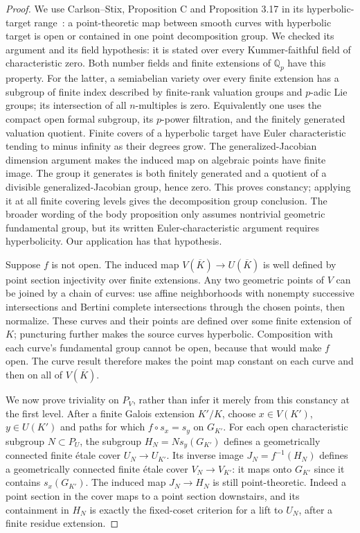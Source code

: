 \documentclass[11pt,oneside]{article}
\begin{document}
\begin{proof}
We use Carlson--Stix, Proposition C and Proposition 3.17 in its
hyperbolic-target range~\cite{F-CarlsonStix}: a point-theoretic
map between smooth curves with hyperbolic target is open or
contained in one point decomposition group. We checked its
argument and its field hypothesis: it is stated over every
Kummer-faithful field of characteristic zero. Both number fields
and finite extensions of $\mathbb Q_p$ have this property.
For the latter, a semiabelian variety over every finite extension
has a subgroup of finite index described by finite-rank valuation
groups and $p$-adic Lie groups; its intersection of all $n$-multiples
is zero. Equivalently one uses the compact open formal subgroup,
its $p$-power filtration, and the finitely generated valuation
quotient. Finite covers of a hyperbolic target have Euler
characteristic tending to minus infinity as their degrees grow.
The generalized-Jacobian dimension argument makes the induced
map on algebraic points have finite image. The group it generates
is both finitely generated and a quotient of a divisible
generalized-Jacobian group, hence zero. This proves constancy;
applying it at all finite covering levels gives the decomposition
group conclusion. The broader wording of the body proposition
only assumes nontrivial geometric fundamental group, but its
written Euler-characteristic argument requires hyperbolicity.
Our application has that hypothesis.

Suppose $f$ is not open. The induced map
$V(\overline K)\to U(\overline K)$ is well defined by point
section injectivity over finite extensions. Any two geometric
points of $V$ can be joined by a chain of curves: use affine
neighborhoods with nonempty successive intersections and
Bertini complete intersections through the chosen points,
then normalize. These curves and their points are defined over
some finite extension of $K$; puncturing further makes the source
curves hyperbolic. Composition with each curve's fundamental
group cannot be open, because that would make $f$ open. The
curve result therefore makes the point map constant on each
curve and then on all of $V(\overline K)$.

We now prove triviality on $P_V$, rather than infer it merely
from this constancy at the first level. After a finite Galois
extension $K'/K$, choose $x\in V(K')$, $y\in U(K')$ and
paths for which $f\circ s_x=s_y$ on $G_{K'}$. For each open
characteristic subgroup $N\subset P_U$, the subgroup
$H_N=N s_y(G_{K'})$ defines a geometrically connected finite
\'etale cover $U_N\to U_{K'}$. Its inverse image
$J_N=f^{-1}(H_N)$ defines a geometrically connected finite
\'etale cover $V_N\to V_{K'}$: it maps onto $G_{K'}$ since
it contains $s_x(G_{K'})$. The induced map $J_N\to H_N$
is still point-theoretic. Indeed a point section in the cover
maps to a point section downstairs, and its containment in
$H_N$ is exactly the fixed-coset criterion for a lift to
$U_N$, after a finite residue extension.


\end{proof}
\end{document}
